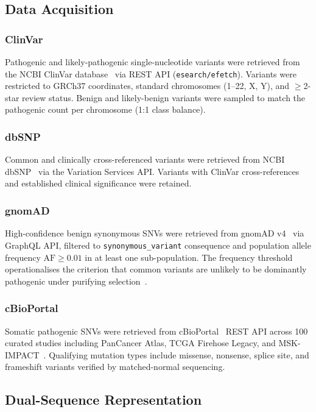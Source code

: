 \documentclass[journal]{IEEEtran}
\begin{document}
\subsection{Data Acquisition}

\subsubsection{ClinVar}
Pathogenic and likely-pathogenic single-nucleotide variants were
retrieved from the NCBI ClinVar database~\cite{Landrum2018} via
REST API (\texttt{esearch/efetch}).
Variants were restricted to GRCh37 coordinates, standard
chromosomes (1--22, X, Y), and $\geq$2-star review status.
Benign and likely-benign variants were sampled to match the
pathogenic count per chromosome (1:1 class balance).

\subsubsection{dbSNP}
Common and clinically cross-referenced variants were retrieved
from NCBI dbSNP~\cite{Sherry2001} via the Variation Services API.
Variants with ClinVar cross-references and established clinical
significance were retained.

\subsubsection{gnomAD}
High-confidence benign synonymous SNVs were retrieved from
gnomAD v4~\cite{Karczewski2020} via GraphQL API, filtered to
\texttt{synonymous\_variant} consequence and population allele
frequency $\text{AF} \geq 0.01$ in at least one sub-population.
The frequency threshold operationalises the criterion that common
variants are unlikely to be dominantly pathogenic under
purifying selection~\cite{Lek2016}.

\subsubsection{cBioPortal}
Somatic pathogenic SNVs were retrieved from cBioPortal~\cite{Gao2013}
REST API across 100 curated studies including PanCancer Atlas,
TCGA Firehose Legacy, and MSK-IMPACT~\cite{Zehir2017}.
Qualifying mutation types include missense, nonsense, splice site,
and frameshift variants verified by matched-normal sequencing.

\subsection{Dual-Sequence Representation}
\end{document}
